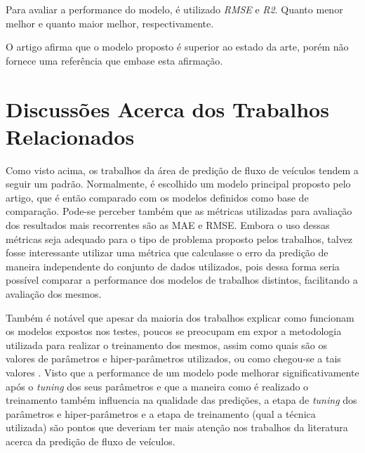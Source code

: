 Para avaliar a performance do modelo, é utilizado \textit{\acrshort{RMSE}} e \textit{\acrfull{R2}}. Quanto menor melhor e quanto maior melhor, respectivamente. 

O artigo afirma que o modelo proposto é superior ao estado da arte, porém não fornece uma referência que embase esta afirmação.

\section{Discussões Acerca dos Trabalhos Relacionados}

Como visto acima, os trabalhos da área de predição de fluxo de veículos tendem a seguir um padrão. Normalmente, é escolhido um modelo principal proposto pelo artigo, que é então comparado com os modelos definidos como base de comparação. Pode-se perceber também que as métricas utilizadas para avaliação dos resultados mais recorrentes são as \acrshort{MAE} e \acrshort{RMSE}. Embora o uso dessas métricas seja adequado para o tipo de problema proposto pelos trabalhos, talvez fosse interessante utilizar uma métrica que calculasse o erro da predição de maneira independente do conjunto de dados utilizados, pois dessa forma seria possível comparar a performance dos modelos de trabalhos distintos, facilitando a avaliação dos mesmos.

Também é notável que apesar da maioria dos trabalhos explicar como funcionam os modelos expostos nos testes, poucos se preocupam em expor a metodologia utilizada para realizar o treinamento dos mesmos, assim como quais são os valores de parâmetros e hiper-parâmetros utilizados, ou como chegou-se a tais valores . Visto que a performance de um modelo pode melhorar significativamente após o \textit{tuning} dos seus parâmetros e que a maneira como é realizado o treinamento também influencia na qualidade das predições, a etapa de \textit{tuning} dos parâmetros e hiper-parâmetros e a etapa de treinamento (qual a técnica utilizada) são pontos que deveriam ter mais atenção nos trabalhos da literatura acerca da predição de fluxo de veículos.